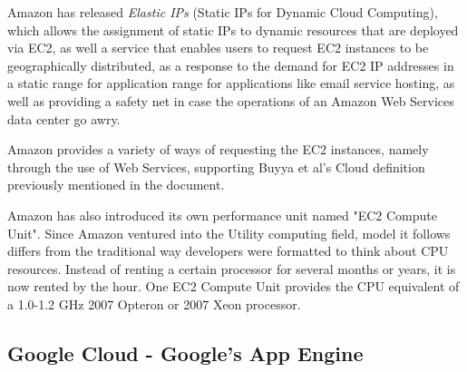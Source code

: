 Amazon has released \textit{Elastic IPs} (Static IPs for Dynamic Cloud Computing), which allows the assignment of static IPs to dynamic resources that are deployed via EC2, as well a service that enables users to request EC2 instances to be geographically distributed, as a response to the demand for EC2 IP addresses in a static range for application range for applications like email service hosting, as well as providing a safety net in case the operations of an Amazon Web Services data center go awry. 

Amazon provides a variety of ways of requesting the EC2 instances, namely through the use of Web Services, supporting Buyya et al's Cloud definition previously mentioned in the document.

Amazon has also introduced its own performance unit named "EC2 Compute Unit". Since Amazon ventured into the Utility computing field, model it follows differs from the traditional way developers were formatted to think about CPU resources. Instead of renting a certain processor for several months or years, it is now rented by the hour. One EC2 Compute Unit provides the CPU equivalent of a 1.0-1.2 GHz 2007 Opteron or 2007 Xeon processor.\cite{amazon-aws}

\subsection{Google Cloud - Google's App Engine}\label{googleapps}

